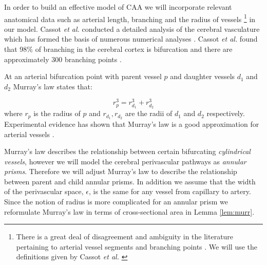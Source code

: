 \documentclass[10pt]{amsart} %
\theoremstyle{definition}
\begin{document}
In order to build an effective model of CAA we will incorporate relevant anatomical data such as arterial length, branching and the radius of vessels \footnote{  There is  a great deal of disagreement and ambiguity in the literature pertaining to arterial vessel segments and branching points \cite{Zamir}.  We will use the definitions given by Cassot \emph{et al.} \cite{Cassot}} in our model.
Cassot \emph{et al.} conducted a detailed analysis of the cerebral vasculature which has formed the basis of numerous numerical analyses \cite{grinberg,francis}. Cassot \emph{et al.} found that 98\% of branching in the cerebral cortex is bifurcation and there are approximately  300 branching points \cite{Cassot}. 


At an arterial bifurcation point with parent vessel $p$ and daughter vessels $d_{1}$ and $d_2$ Murray's law \cite{Murray} states that:

\[r_{p}^{3} = r_{d_{1}}^{3} + r_{d_{2}}^{3}\]
where $r_{p}$ is the radius of $p$ and $r_{d_{1}},r_{d_{2}}$ are the radii of $d_{1}$ and 
$d_{2}$ respectively.
Experimental evidence has shown that Murray's law is a good approximation for 
arterial vessels \cite{Zamir,cohn}.

Murray's law describes the relationship between certain bifurcating  
\emph{cylindrical vessels}, however we will model the cerebral perivascular pathways as \emph{annular prisms}.  Therefore we will adjust Murray's law to describe 
the relationship between parent and child annular prisms. In addition we assume that the width of the perivascular space, $\epsilon$, is the same for any vessel from capillary to
 artery. Since the notion of radius is more 
complicated for an annular prism we reformulate Murray's law in terms of 
cross-sectional area in Lemma \ref{lem:murr}.   

\end{document}
